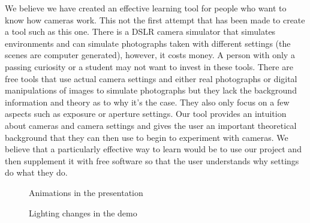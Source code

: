 \documentclass{acm_proc_article-sp}
\begin{document}
We believe we have created an effective learning tool for people who want to
know how cameras work. This not the first attempt that has been made to create
a tool such as this one. There is a DSLR camera simulator \cite{camerasim} that
simulates environments and can simulate photographs taken with different
settings (the scenes are computer generated), however, it costs money. A person
with only a passing curiosity or a  student may not want to invest in these
tools. There are free tools \cite{cannonsim, interactiveap} that use actual
camera settings and either real photographs or digital manipulations of images
to simulate photographs but they lack the background information and theory as
to why it's the case. They also only focus on a few aspects such as exposure or
aperture settings. Our tool provides an intuition about cameras and camera
settings and gives the user an important theoretical background that they can
then use to begin to experiment with cameras. We believe that a particularly
effective way to learn would be to use our project and then supplement it with
free software so that the user understands why settings do what they do.

\begin{figure}[h]%
    \centering
    \qquad
    \caption{Animations in the presentation}%
    \label{fig:example}%
    \qquad
    \qquad
    \caption{Lighting changes in the demo}%
    \label{fig:example}%
\end{figure}
\end{document}
